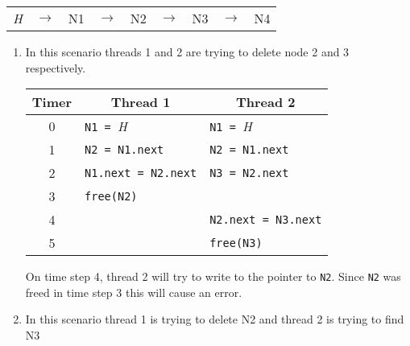\documentclass[12pt]{article}
\begin{document}
\begin{center}
    \begin{tabular}{ c  c | c | c | c | c | c | c | c |}
        \cline{3-3}\cline{5-5}\cline{7-7}\cline{9-9}
        \emph{H} & $\rightarrow$ &
        N1 & $\rightarrow$ & 
        N2 & $\rightarrow$ & 
        N3 & $\rightarrow$ & 
        N4 \\
        \cline{3-3}\cline{5-5}\cline{7-7}\cline{9-9}
    \end{tabular}
\end{center}

\begin{enumerate}[label=\alph*.]
    \item \addtocounter{enumi}{1} In this scenario threads 1 and 2 are trying to delete node 2 and 3 respectively.
    
    \begin{center}
        \begin{tabular}{| c | l | l |}
            \hline
            \multicolumn{1}{|c|}{Timer} & \multicolumn{1}{|c|}{Thread 1} & \multicolumn{1}{|c|}{Thread 2}\\ \hline
            0     & \texttt{N1 = }\emph{H}      & \texttt{N1 = }\emph{H} \\ \hline
            1     & \texttt{N2 = N1.next}       & \texttt{N2 = N1.next} \\ \hline
            2     & \texttt{N1.next = N2.next}  & \texttt{N3 = N2.next} \\ \hline
            3     & \texttt{free(N2)}           &  \\ \hline
            4     &                             & \texttt{N2.next = N3.next} \\ \hline
            5     &                             & \texttt{free(N3)} \\
            \hline
        \end{tabular}
    \end{center}
    
    On time step 4, thread 2 will try to write to the pointer to \texttt{N2}. Since \texttt{N2} was freed in time step 3 this will cause an error.
        
    \item \addtocounter{enumi}{1} In this scenario thread 1 is trying to delete N2 and thread 2 is trying to find N3
    

\end{enumerate}
\end{document}
